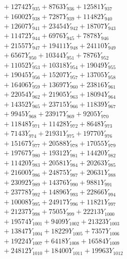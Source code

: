 \documentclass[a4paper,10pt]{article}
\begin{document}
{\begin{align}
&\;  + 12742 Y_{935} + 8763 Y_{936} + 12581 Y_{937} \\[0.3ex]
&\;  + 16002 Y_{938} + 7287 Y_{939} + 11482 Y_{940} \\[0.3ex]
&\;  + 12607 Y_{941} + 23454 Y_{942} + 18707 Y_{943} \\[0.3ex]
&\;  + 11472 Y_{944} + 6976 Y_{945} + 7878 Y_{946} \\[0.3ex]
&\;  + 21557 Y_{947} + 19411 Y_{948} + 24110 Y_{949} \\[0.3ex]
&\;  + 6567 Y_{950} + 10344 Y_{951} + 7876 Y_{952} \\[0.3ex]
&\;  + 11052 Y_{953} + 10318 Y_{954} + 19049 Y_{955} \\[0.3ex]
&\;  + 19045 Y_{956} + 15207 Y_{957} + 13705 Y_{958} \\[0.5ex]\allowbreak
&\;  + 16406 Y_{959} + 13697 Y_{960} + 23816 Y_{961} \\[0.3ex]
&\;  + 22054 Y_{962} + 21905 Y_{963} + 18094 Y_{964} \\[0.3ex]
&\;  + 14352 Y_{965} + 23715 Y_{966} + 11839 Y_{967} \\[0.3ex]
&\;  + 9945 Y_{968} + 23917 Y_{969} + 9205 Y_{970} \\[0.3ex]
&\;  + 11848 Y_{971} + 11428 Y_{972} + 8648 Y_{973} \\[0.3ex]
&\;  + 7143 Y_{974} + 21931 Y_{975} + 19770 Y_{976} \\[0.3ex]
&\;  + 15167 Y_{977} + 20588 Y_{978} + 17055 Y_{979} \\[0.3ex]
&\;  + 19767 Y_{980} + 19312 Y_{981} + 14420 Y_{982} \\[0.3ex]
&\;  + 11420 Y_{983} + 20581 Y_{984} + 20263 Y_{985} \\[0.3ex]
&\;  + 21600 Y_{986} + 24875 Y_{987} + 20631 Y_{988} \\[0.5ex]\allowbreak
&\;  + 23092 Y_{989} + 14376 Y_{990} + 9881 Y_{991} \\[0.3ex]
&\;  + 23778 Y_{992} + 14896 Y_{993} + 22866 Y_{994} \\[0.3ex]
&\;  + 10008 Y_{995} + 24917 Y_{996} + 11821 Y_{997} \\[0.3ex]
&\;  + 21237 Y_{998} + 7505 Y_{999} + 22213 Y_{1000} \\[0.3ex]
&\;  + 19574 Y_{1001} + 9409 Y_{1002} + 21323 Y_{1003} \\[0.3ex]
&\;  + 13847 Y_{1004} + 18229 Y_{1005} + 7357 Y_{1006} \\[0.3ex]
&\;  + 19224 Y_{1007} + 6418 Y_{1008} + 16584 Y_{1009} \\[0.3ex]
&\;  + 24812 Y_{1010} + 18400 Y_{1011} + 19963 Y_{1012} \\[0.3ex]

\end{align}}
\end{document}
